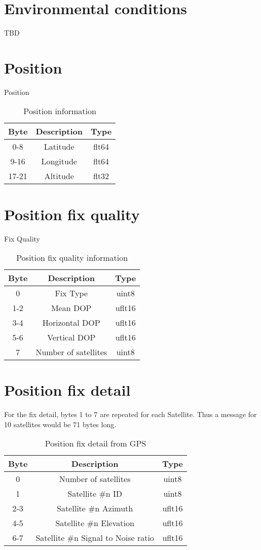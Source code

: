 \section{Environmental conditions}
\label{msg002}
TBD

\section{Position}
\label{msg003}
Position
\begin{table}[H]
  \centering
  \begin{tabular}{ c c c }
  Byte & Description & Type \\
\hline
   0-8  & Latitude  & flt64 \\
   9-16  & Longitude & flt64 \\
   17-21 & Altitude  & flt32 \\
  \end{tabular}
  \caption{Position information}
\end{table}

\section{Position fix quality}
\label{msg004}
Fix Quality
\begin{table}[H]
  \centering
  \begin{tabular}{ c c c }
  Byte & Description & Type \\
\hline
    0  & Fix Type             & uint8  \\
   1-2 & Mean DOP             & uflt16 \\
   3-4 & Horizontal DOP       & uflt16 \\
   5-6 & Vertical DOP         & uflt16 \\
    7  & Number of satellites & uint8  \\
  \end{tabular}
  \caption{Position fix quality information}
\end{table}

\section{Position fix detail}
\label{msg005}
For the fix detail, bytes 1 to 7 are repeated for each Satellite. Thus a message for 10 satellites would be 71 bytes long. 

\begin{table}[H]
  \centering
  \begin{tabular}{ c c c }
  Byte & Description & Type \\
\hline
    0  & Number of satellites               & uint8  \\
    1  & Satellite \#n ID                   & uint8  \\
   2-3 & Satellite \#n Azimuth               & uflt16 \\
   4-5 & Satellite \#n Elevation             & uflt16 \\
   6-7 & Satellite \#n Signal to Noise ratio & uflt16 \\
  \end{tabular}
  \caption{Position fix detail from GPS}
\end{table}

